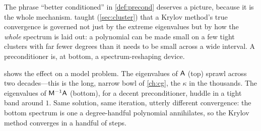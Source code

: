 The phrase ``better conditioned'' in \cref{def:precond} deserves a picture, because it
is the whole mechanism.  taught (\cref{sec:cluster}) that a Krylov method's
true convergence is governed not just by the extreme eigenvalues but by how the
\emph{whole} spectrum is laid out: a polynomial can be made small on a few tight clusters
with far fewer degrees than it needs to be small across a wide interval. A preconditioner
is, at bottom, a spectrum-reshaping device.

 shows the effect on a model problem. The eigenvalues of $\mathsf{A}$
(top) sprawl across two decades---this is the long, narrow bowl of \cref{ch:cg}, the
$\kappa$ in the thousands. The eigenvalues of $\mathsf{M}^{-1}\mathsf{A}$ (bottom), for a
decent preconditioner, huddle in a tight band around $1$. Same solution, same iteration,
utterly different convergence: the bottom spectrum is one a degree-handful polynomial
annihilates, so the Krylov method converges in a handful of steps.

